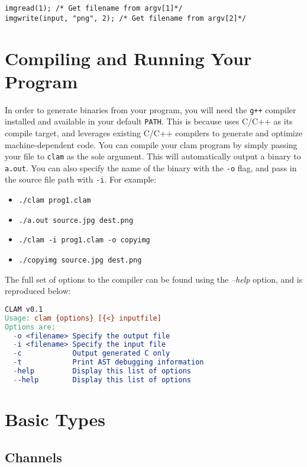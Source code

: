 \begin{lstlisting}[language=CLAM,escapechar=\%]
imgread(1); /* Get filename from argv[1]*/
imgwrite(input, "png", 2); /* Get filename from argv[2]*/
\end{lstlisting}

\section{Compiling and Running Your Program}

In order to generate binaries from your \sys{} program, you will need the \texttt{g++} compiler
installed and available in your default \texttt{PATH}. This is because \sys{} uses C/C++ as its
compile target, and leverages existing C/C++ compilers to generate and optimize machine-dependent code.
You can compile your clam program by simply passing your file to \texttt{clam} as the sole argument.
This will automatically output a binary to \texttt{a.out}. You can also specify the name of
the binary with the \texttt{-o} flag, and pass in the source file path with \texttt{-i}.
For example:
\begin{itemize}
  \item \texttt{./clam prog1.clam}
  \item \texttt{./a.out source.jpg dest.png}
  \item \texttt{./clam -i prog1.clam -o copyimg}
  \item \texttt{./copyimg source.jpg dest.png}
\end{itemize}

The full set of options to the \sys{} compiler can be found using the \emph{--help} option, and is
reproduced below:
\begin{lstlisting}[language=make,basicstyle=\ttfamily]
CLAM v0.1
Usage: clam {options} [{<} inputfile]
Options are:
  -o <filename> Specify the output file
  -i <filename> Specify the input file
  -c            Output generated C only
  -t            Print AST debugging information
  -help         Display this list of options
  --help        Display this list of options
\end{lstlisting}

\section{Basic Types}

\subsection{Channels}

